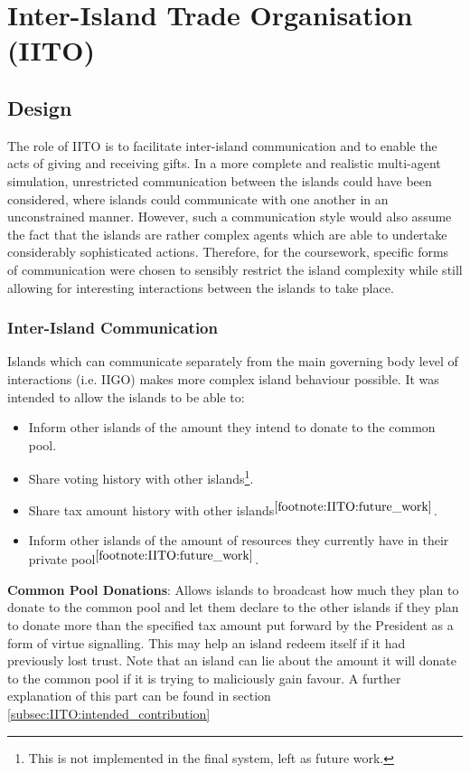 \chapter{Inter-Island Trade Organisation (IITO)}

\section{Design}
\label{sec:IITO:Design}

The role of IITO is to facilitate inter-island communication and to enable the acts of giving and receiving gifts. In a more complete and realistic multi-agent simulation, unrestricted communication between the islands could have been considered, where islands could communicate with one another in an unconstrained manner. However, such a communication style would also assume the fact that the islands are rather complex agents which are able to undertake considerably sophisticated actions. Therefore, for the coursework, specific forms of communication were chosen to sensibly restrict the island complexity while still allowing for interesting interactions between the islands to take place.

\subsection{Inter-Island Communication}  
\label{subsec:IITO:inter_island_communication}

Islands which can communicate separately from the main governing body level of interactions (i.e. IIGO) makes more complex island behaviour possible. It was intended to allow the islands to be able to:

\begin{itemize}
    \item Inform other islands of the amount they intend to donate to the common pool.
    \item Share voting history with other islands\footnote{\label{footnote:IITO:future_work}This is not implemented in the final system, left as future work.}.
    \item Share tax amount history with other islands$^{\ref{footnote:IITO:future_work}}$.
    \item Inform other islands of the amount of resources they currently have in their private pool$^{\ref{footnote:IITO:future_work}}$.
\end{itemize}


\textbf{Common Pool Donations}: Allows islands to broadcast how much they plan to donate to the common pool and let them declare to the other islands if they plan to donate more than the specified tax amount put forward by the President as a form of virtue signalling. This may help an island redeem itself if it had previously lost trust. Note that an island can lie about the amount it will donate to the common pool if it is trying to maliciously gain favour. A further explanation of this part can be found in section \ref{subsec:IITO:intended_contribution}

